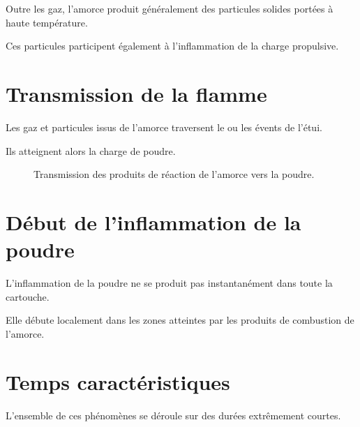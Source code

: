 Outre les gaz, l'amorce produit généralement des particules solides portées à
haute température.

Ces particules participent également à l'inflammation de la charge propulsive.

\section{Transmission de la flamme}

Les gaz et particules issus de l'amorce traversent le ou les évents de
l'étui.

Ils atteignent alors la charge de poudre.

\begin{figure}[htbp]
\centering


\caption{Transmission des produits de réaction de l'amorce vers la poudre.}
\label{fig:transmission_flamme}

\end{figure}

\section{Début de l'inflammation de la poudre}

L'inflammation de la poudre ne se produit pas instantanément dans toute la
cartouche.

Elle débute localement dans les zones atteintes par les produits de
combustion de l'amorce.

\section{Temps caractéristiques}

L'ensemble de ces phénomènes se déroule sur des durées extrêmement courtes.

